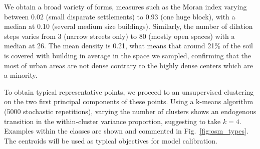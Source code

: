 \documentclass[letterpaper]{article}
\begin{document}







We obtain a broad variety of forms, measures such as the Moran index varying between 0.02 (small disparate settlements) to 0.93 (one huge block), with a median at 0.10 (several medium size buildings). Similarly, the number of dilation steps varies from 3 (narrow streets only) to 80 (mostly open spaces) with a median at 26. The mean density is 0.21, what means that around 21\% of the soil is covered with building in average in the space we sampled, confirming that the most of urban areas are not dense contrary to the highly dense centers which are a minority.


To obtain typical representative points, we proceed to an unsupervised clustering on the two first principal components of these points. Using a k-means algorithm (5000 stochastic repetitions), varying the number of clusters shows an endogenous transition in the within-cluster variance proportion, suggesting to take $k=4$. Examples within the classes are shown and commented in Fig.~\ref{fig:osm_types}. The centroids will be used as typical objectives for model calibration.
\end{document}
